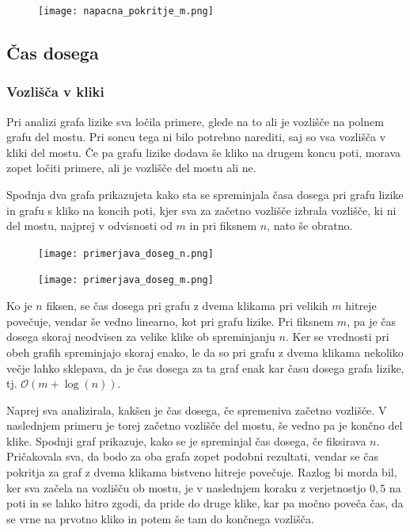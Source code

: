 \documentclass[12pt,a4paper]{amsart}
\begin{document}
\begin{figure}[h]
\texttt{[image: napacna\_pokritje\_m.png]}
\end{figure}

\subsection{Čas dosega}
\subsubsection{Vozlišča v kliki}

Pri analizi grafa lizike sva ločila primere, glede na to ali je vozlišče na polnem grafu del mostu. Pri soncu
tega ni bilo potrebno narediti, saj so vsa vozlišča v kliki del mostu. Če pa grafu lizike dodava še kliko na drugem koncu poti,
morava zopet ločiti primere, ali je vozlišče del mostu ali ne.

Spodnja dva grafa prikazujeta kako sta se spreminjala časa dosega pri grafu lizike in grafu s kliko na koncih poti, kjer 
sva za začetno vozlišče izbrala vozlišče, ki ni del mostu, najprej
v odvisnosti od $m$ in pri fiksnem $n$, nato še obratno. 

\begin{figure}[h]
\texttt{[image: primerjava\_doseg\_n.png]}
\end{figure}

\begin{figure}[h]
\texttt{[image: primerjava\_doseg\_m.png]}
\end{figure}

Ko je $n$ fiksen, se čas dosega pri grafu z dvema klikama pri velikih $m$ hitreje povečuje, vendar
še vedno linearno, kot pri grafu lizike. 
Pri fiksnem $m$, pa je čas dosega skoraj neodvisen za velike klike ob spreminjanju $n$. Ker se vrednosti pri obeh
grafih spreminjajo skoraj enako, le da so pri grafu z dvema klikama nekoliko večje lahko sklepava, da je čas dosega
za ta graf enak kar času dosega grafa lizike, tj. $\mathcal{O}(m+\log(n))$.

Naprej sva analizirala, kakšen je čas dosega, če spremeniva začetno vozlišče. V naslednjem primeru je torej 
začetno vozlišče del mostu, še vedno pa je končno del klike. Spodnji graf prikazuje, kako se je spreminjal čas dosega, če fiksirava
$n$. Pričakovala sva, da bodo za oba grafa zopet podobni rezultati, vendar se čas pokritja za graf z dvema klikama bistveno hitreje
povečuje. Razlog bi morda bil, ker sva začela na vozlišču ob mostu, je v naslednjem koraku z  verjetnostjo $0,5$ na poti in 
se lahko hitro zgodi, da pride do druge klike, kar pa močno poveča čas, da se vrne na prvotno kliko in potem še tam do 
končnega vozlišča.
\end{document}
